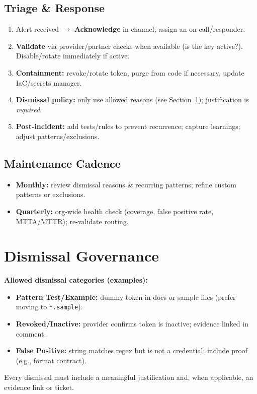 \documentclass[11pt,a4paper]{article}
\begin{document}
\subsection{Triage \& Response}
\begin{enumerate}[label=\alph*)]
  \item Alert received $\rightarrow$ \textbf{Acknowledge} in channel; assign an on-call/responder.
  \item \textbf{Validate} via provider/partner checks when available (is the key active?). Disable/rotate immediately if active.
  \item \textbf{Containment:} revoke/rotate token, purge from code if necessary, update IaC/secrets manager.
  \item \textbf{Dismissal policy:} only use allowed reasons (see Section~\ref{sec:dismissal}); justification is \emph{required}.
  \item \textbf{Post-incident:} add tests/rules to prevent recurrence; capture learnings; adjust patterns/exclusions.
\end{enumerate}

\subsection{Maintenance Cadence}
\begin{itemize}
  \item \textbf{Monthly:} review dismissal reasons \& recurring patterns; refine custom patterns or exclusions.
  \item \textbf{Quarterly:} org-wide health check (coverage, false positive rate, MTTA/MTTR); re-validate routing.
\end{itemize}

\section{Dismissal Governance}\label{sec:dismissal}
\begin{tcolorbox}
\textbf{Allowed dismissal categories (examples):}
\begin{itemize}
  \item \textbf{Pattern Test/Example:} dummy token in docs or sample files (prefer moving to \texttt{*.sample}).
  \item \textbf{Revoked/Inactive:} provider confirms token is inactive; evidence linked in comment.
  \item \textbf{False Positive:} string matches regex but is not a credential; include proof (e.g., format contract).
\end{itemize}
\end{tcolorbox}
\noindent
Every dismissal must include a meaningful justification and, when applicable, an evidence link or ticket.
\end{document}
